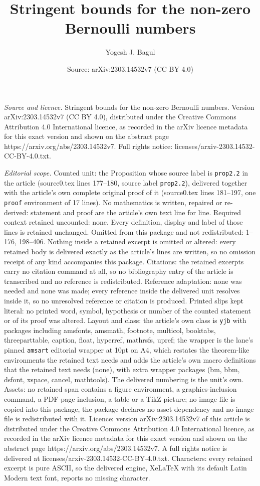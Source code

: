 \documentclass[10pt,a4paper]{amsart}
\title[Stringent bounds for the non-zero Bernoulli numbers]{Stringent bounds for the non-zero Bernoulli numbers}
\author{Yogesh J. Bagul}
\date{Source: arXiv:2303.14532v7 (CC BY 4.0)}
\begin{document}
\maketitle

\noindent\emph{Source and licence.} Stringent bounds for the non-zero Bernoulli numbers. Version arXiv:2303.14532v7 (CC BY 4.0), distributed under the Creative Commons Attribution 4.0 International licence, as recorded in the arXiv licence metadata for this exact version and shown on the abstract page https://arxiv.org/abs/2303.14532v7. Full rights notice: licenses/arxiv-2303.14532-CC-BY-4.0.txt.\par\smallskip

\noindent\textit{Editorial scope.} Counted unit: the Proposition whose source label is \texttt{prop2.2} in the article (source0.tex lines 177--180, source label \texttt{prop2.2}), delivered together with the article's own complete original proof of it (source0.tex lines 181--197, one \texttt{proof} environment of 17 lines). No mathematics is written, repaired or re-derived: statement and proof are the article's own text line for line. Required context retained uncounted: none. Every definition, display and label of those lines is retained unchanged. Omitted from this package and not redistributed: 1--176, 198--406. Nothing inside a retained excerpt is omitted or altered: every retained body is delivered exactly as the article's lines are written, so no omission receipt of any kind accompanies this package. Citations: the retained excerpts carry no citation command at all, so no bibliography entry of the article is transcribed and no reference is redistributed. Reference adaptation: none was needed and none was made; every reference inside the delivered unit resolves inside it, so no unresolved reference or citation is produced. Printed slips kept literal: no printed word, symbol, hypothesis or number of the counted statement or of its proof was altered. Layout and class: the article's own class is \texttt{yjb} with packages including amsfonts, amsmath, footnote, multicol, booktabs, threeparttable, caption, float, hyperref, mathrsfs, upref; the wrapper is the lane's pinned \texttt{amsart} editorial wrapper at 10pt on A4, which restates the theorem-like environments the retained text needs and adds the article's own macro definitions that the retained text needs (none), with extra wrapper packages (bm, bbm, dsfont, xspace, cancel, mathtools). The delivered numbering is the unit's own. Assets: no retained span contains a figure environment, a graphics-inclusion command, a PDF-page inclusion, a table or a TikZ picture; no image file is copied into this package, the package declares no asset dependency and no image file is redistributed with it. Licence: version arXiv:2303.14532v7 of this article is distributed under the Creative Commons Attribution 4.0 International licence, as recorded in the arXiv licence metadata for this exact version and shown on the abstract page https://arxiv.org/abs/2303.14532v7. A full rights notice is delivered at licenses/arxiv-2303.14532-CC-BY-4.0.txt. Characters: every retained excerpt is pure ASCII, so the delivered engine, XeLaTeX with its default Latin Modern text font, reports no missing character.
\end{document}
